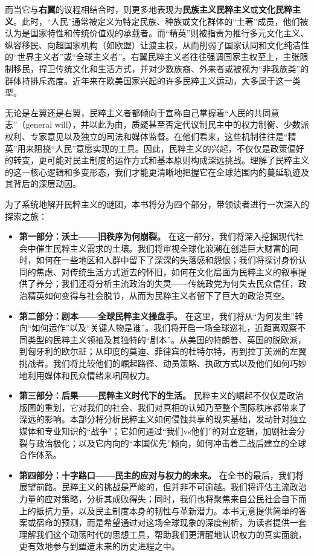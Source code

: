 而当它与\textbf{右翼}的议程相结合时，则更多地表现为\textbf{民族主义民粹主义}或\textbf{文化民粹主义}。此时，“人民”通常被定义为特定民族、种族或文化群体的“土著”成员，他们被认为是国家特性和传统价值观的承载者。而“精英”则被指责为推行多元文化主义、纵容移民、向超国家机构（如欧盟）让渡主权，从而削弱了国家认同和文化纯洁性的“世界主义者”或“全球主义者”。右翼民粹主义者往往强调国家主权至上，主张限制移民，捍卫传统文化和生活方式，并对少数族裔、外来者或被视为“非我族类”的群体持排斥态度。近年来在欧美国家兴起的许多民粹主义运动，大多属于这一类型。

无论是左翼还是右翼，民粹主义者都倾向于宣称自己掌握着“人民的共同意志”（general will），并以此为由，质疑甚至否定代议制民主中的权力制衡、少数派权利、专家意见以及独立的司法和媒体监督。在他们看来，这些机制往往是“精英”用来阻挠“人民”意愿实现的工具。因此，民粹主义的兴起，不仅仅是政策偏好的转变，更可能对民主制度的运作方式和基本原则构成深远挑战。理解了民粹主义的这一核心逻辑和多变形态，我们才能更清晰地把握它在全球范围内的蔓延轨迹及其背后的深层动因。

为了系统地解开民粹主义的谜团，本书将分为四个部分，带领读者进行一次深入的探索之旅：

\begin{itemize}
    \item \textbf{第一部分：沃土——旧秩序为何崩裂。} 在这一部分，我们将深入挖掘现代社会中催生民粹主义需求的土壤。我们将审视全球化浪潮在创造巨大财富的同时，如何在一些地区和人群中留下了深深的失落感和怨恨；我们将探讨身份认同的焦虑、对传统生活方式逝去的怀旧，如何在文化层面为民粹主义的叙事提供了养分；我们还将分析主流政治的失灵——传统政党为何失去民众信任，政治精英如何变得与社会脱节，从而为民粹主义者留下了巨大的政治真空。
    \item \textbf{第二部分：剧本——全球民粹主义操盘手。} 在这里，我们将从“为何发生”转向“如何运作”以及“关键人物是谁”。我们将开启一场全球巡礼，近距离观察不同类型的民粹主义领袖及其独特的“剧本”。从美国的特朗普、英国的脱欧派，到匈牙利的欧尔班；从印度的莫迪、菲律宾的杜特尔特，再到拉丁美洲的左翼挑战者。我们将比较他们的崛起路径、动员策略、执政方式以及他们如何巧妙地利用媒体和民众情绪来巩固权力。
    \item \textbf{第三部分：后果——民粹主义时代下的生活。} 民粹主义的崛起不仅仅是政治版图的重划，它对我们的社会、我们对真相的认知乃至整个国际秩序都带来了深远的影响。本部分将分析民粹主义如何侵蚀共享的现实基础，发动针对独立媒体和专业知识的“战争”；它如何通过“我们vs他们”的对立逻辑，加剧社会分裂与政治极化；以及它内向的“本国优先”倾向，如何冲击着二战后建立的全球合作体系。
    \item \textbf{第四部分：十字路口——民主的应对与权力的未来。} 在全书的最后，我们将展望前路。民粹主义的挑战是严峻的，但并非不可逾越。我们将评估主流政治力量的应对策略，分析其成败得失；同时，我们也将聚焦来自公民社会自下而上的抵抗力量，以及民主制度本身的韧性与革新潜力。本书无意提供简单的答案或宿命的预测，而是希望通过对这场全球现象的深度剖析，为读者提供一套理解我们这个动荡时代的思想工具，帮助我们更清醒地认识权力的真实面貌，更有效地参与到塑造未来的历史进程之中。
\end{itemize}